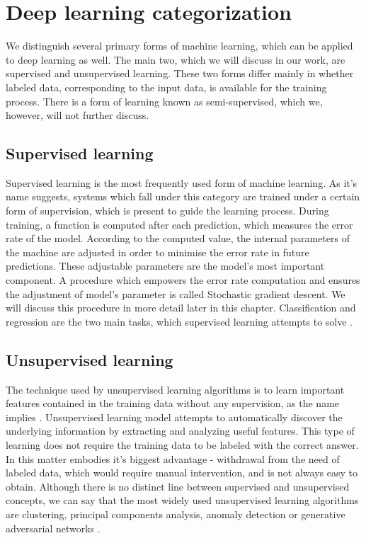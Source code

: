 \section{Deep learning categorization}
We distinguish several primary forms of machine learning, which can be applied to deep learning as well. The main two, which we will discuss in our work, are supervised and unsupervised learning.  \cite{lecundeeplearning} These two forms differ mainly in whether labeled data, corresponding to the input data, is available for the training process. There is a form of learning known as semi-supervised, which we, however, will not further discuss.

\subsection{Supervised learning}
Supervised learning  is the most frequently used form of machine learning. \cite{lecundeeplearning} As it's name suggests, systems which fall under this category are trained under a certain form of supervision, which is present to guide the learning process. During training, a function is computed after each prediction, which measures the error rate of the model. According to the computed value, the internal parameters of the machine are adjusted in order to minimise the error rate in future predictions. These adjustable parameters are the model's most important component. A procedure which empowers the error rate computation and ensures the adjustment of model's parameter is called Stochastic gradient descent. We will discuss this procedure in more detail later in this chapter. Classification and regression are the two main tasks, which supervised learning attempts to solve \cite{kim2019deep}.

\subsection{Unsupervised learning} 
The technique used by unsupervised learning algorithms is to learn important features contained in the training data without any supervision, as the name implies \cite{deeplearningbook}. Unsupervised learning model attempts to automatically discover the underlying information by extracting and analyzing useful features. This type of learning does not require the training data to be labeled with the correct answer. In this matter embodies it's biggest advantage - withdrawal from the need of labeled data, which would require manual intervention, and is not always easy to obtain. Although there is no distinct line between supervised and unsupervised concepts, we can say that the most widely used unsupervised learning algorithms are clustering, principal components analysis, anomaly detection or generative adversarial networks \cite{deeplearningbook, kim2019deep}.

